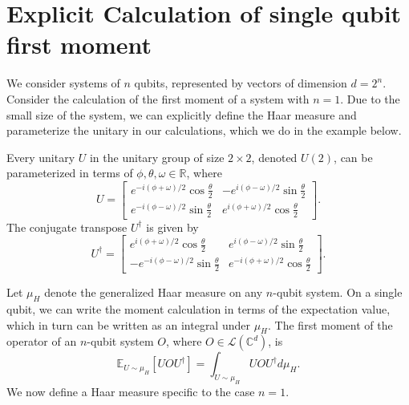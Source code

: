 \section{Explicit Calculation of single qubit first moment}
We consider systems of $n$ qubits, represented by vectors of dimension $d = 2^n$.
Consider the calculation of the first moment of a system with $n = 1$.
Due to the small size of the system, we can explicitly define the Haar measure and parameterize the unitary in our calculations, which we do in the example below.

\begin{remark}\label{rm:2x2_unitary_explicit_construction}
    Every unitary $U$ in the unitary group of size $2 \times 2$, denoted $U(2)$, can be parameterized in terms of $\phi, \theta, \omega \in \mathbb{R}$, where
    \begin{equation}
        U = \begin{bmatrix}
            e^{-i (\phi + \omega) / 2} \cos{\frac{\theta}{2}} & -e^{i (\phi - \omega) / 2} \sin{\frac{\theta}{2}}\\
            e^{-i (\phi - \omega) / 2} \sin{\frac{\theta}{2}} & e^{i (\phi + \omega) / 2} \cos{\frac{\theta}{2}}
        \end{bmatrix}.
    \end{equation}
    The conjugate transpose $U^{\dagger}$ is given by
    \begin{equation}
        U^{\dagger} = \begin{bmatrix}
        e^{i( \phi + \omega) / 2} \cos{\frac{\theta}{2}} & e^{i (\phi - \omega) / 2} \sin{\frac{\theta}{2}}\\
        - e^{-i (\phi - \omega) / 2} \sin{\frac{\theta}{2}} & e^{-i(\phi + \omega)/ 2} \cos{\frac{\theta}{2}}
        \end{bmatrix}.
    \end{equation}
\end{remark}

Let $\mu_{H}$ denote the generalized Haar measure on any $n$-qubit system.
On a single qubit, we can write the moment calculation in terms of the expectation value, which in turn can be written as an integral under $\mu_{H}$.
The first moment of the operator of an $n$-qubit system $O$, where $O \in \mathcal{L}(\mathbb{C}^{d})$, is
\begin{equation}
    \mathbb{E}_{U \sim \mu_{H}} [U O U^{\dagger}] = \int_{U \sim \mu_{H}} U O U^{\dagger} d\mu_{H}.
\end{equation}
We now define a Haar measure specific to the case $n = 1$.

